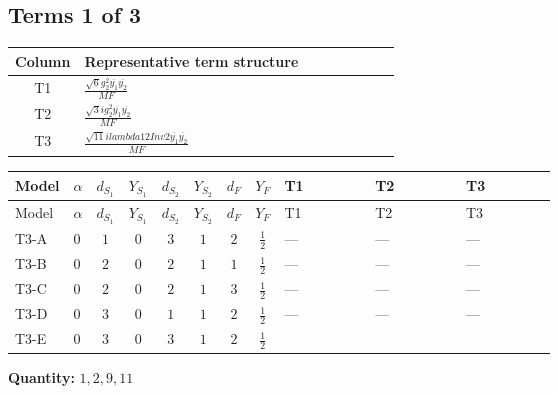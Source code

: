 \documentclass[8pt]{article}
\begin{document}
\begin{landscape}
\subsection*{Terms 1 of 3}
\begin{center}
\begin{tabular}{@{}c >{\raggedright\arraybackslash}p{0.82\linewidth}@{}}
\toprule
Column & Representative term structure \\
\midrule
T1 & \(\displaystyle \frac{\sqrt{6} g_{2}^{2} \overline{y_{1}} \overline{y_{2}}}{MF}\) \\
\midrule
T2 & \(\displaystyle \frac{\sqrt{3} i g_{2}^{2} \overline{y_{1}} \overline{y_{2}}}{MF}\) \\
\midrule
T3 & \(\displaystyle \frac{\sqrt{11} i lambda12Inv2 \overline{y_{1}} \overline{y_{2}}}{MF}\) \\
\midrule
\bottomrule
\end{tabular}
\end{center}
\smallskip
\tiny
\begin{longtable}{@{}llcccccc >{\raggedright\arraybackslash}p{0.21\linewidth} >{\raggedright\arraybackslash}p{0.21\linewidth} >{\raggedright\arraybackslash}p{0.21\linewidth}@{}}
\toprule
Model & $\alpha$ & $d_{S_1}$ & $Y_{S_1}$ & $d_{S_2}$ & $Y_{S_2}$ & $d_F$ & $Y_F$ & T1 & T2 & T3 \\
\midrule
\endfirsthead
\toprule
Model & $\alpha$ & $d_{S_1}$ & $Y_{S_1}$ & $d_{S_2}$ & $Y_{S_2}$ & $d_F$ & $Y_F$ & T1 & T2 & T3 \\
\midrule
\endhead
T3-A & $0$ & $1$ & $0$ & $3$ & $1$ & $2$ & $\frac{1}{2}$ & --- & --- & --- \\
\midrule
T3-B & $0$ & $2$ & $0$ & $2$ & $1$ & $1$ & $\frac{1}{2}$ & --- & --- & --- \\
\midrule
T3-C & $0$ & $2$ & $0$ & $2$ & $1$ & $3$ & $\frac{1}{2}$ & --- & --- & --- \\
\midrule
T3-D & $0$ & $3$ & $0$ & $1$ & $1$ & $2$ & $\frac{1}{2}$ & --- & --- & --- \\
\midrule
T3-E & $0$ & $3$ & $0$ & $3$ & $1$ & $2$ & $\frac{1}{2}$ & \scriptsize\adjustbox{max width=\linewidth}{$\begin{gathered} - \frac{\sqrt{6} g_{2}^{2} \overline{y_{1}} \overline{y_{2}}}{6 MF}\end{gathered}$} & \scriptsize\adjustbox{max width=\linewidth}{$\begin{gathered} - \frac{15 \sqrt{3} i g_{2}^{2} \overline{y_{1}} \overline{y_{2}}}{8 MF}\end{gathered}$} & \scriptsize\adjustbox{max width=\linewidth}{$\begin{gathered} - \frac{3 \sqrt{11} i lambda12Inv2 \overline{y_{1}} \overline{y_{2}}}{22 MF}\end{gathered}$} \\
\midrule
\bottomrule
\end{longtable}
\clearpage
\noindent\textbf{Quantity: }$\mathrm{1,2,9,11}$\par\smallskip

\end{landscape}
\end{document}
